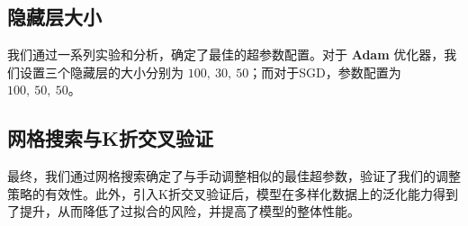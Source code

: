     \subsection{隐藏层大小}
        \par 我们通过一系列实验和分析，确定了最佳的超参数配置。对于 \textbf{Adam} 优化器，我们设置三个隐藏层的大小分别为 $100, \ 30, \ 50$；而对于SGD，参数配置为 $100, \ 50, \ 50$。
    \subsection{网格搜索与K折交叉验证}
        \par 最终，我们通过网格搜索确定了与手动调整相似的最佳超参数，验证了我们的调整策略的有效性。此外，引入K折交叉验证后，模型在多样化数据上的泛化能力得到了提升，从而降低了过拟合的风险，并提高了模型的整体性能。
